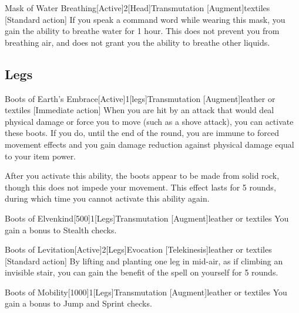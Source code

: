         \begin{magicitemdef}{Mask of Water Breathing}[Active]{2}[Head]{Transmutation [Augment]}{textiles}
            [Standard action] If you speak a command word while wearing this mask, you gain the ability to breathe water for 1 hour.
            This does not prevent you from breathing air, and does not grant you the ability to breathe other liquids.
        \end{magicitemdef}

    \subsection{Legs}

        \begin{magicitemdef}{Boots of Earth's Embrace}[Active]{1}[legs]{Transmutation [Augment]}{leather or textiles}
            [Immediate action] When you are hit by an attack that would deal physical damage or force you to move (such as a shove attack), you can activate these boots.
            If you do, until the end of the round, you are immune to forced movement effects and you gain damage reduction against physical damage equal to your item power.

            After you activate this ability, the boots appear to be made from solid rock, though this does not impede your movement.
            This effect lasts for 5 rounds, during which time you cannot activate this ability again.
        \end{magicitemdef}

        \begin{magicitemdef}{Boots of Elvenkind}[500]{1}[Legs]{Transmutation [Augment]}{leather or textiles}
             You gain a  bonus to Stealth checks.
        \end{magicitemdef}

        \begin{magicitemdef}{Boots of Levitation}[Active]{2}[Legs]{Evocation [Telekinesis]}{leather or textiles}
            [Standard action] By lifting and planting one leg in mid-air, as if climbing an invisible stair, you can gain the benefit of the  spell on yourself for 5 rounds.
        \end{magicitemdef}

        \begin{magicitemdef}{Boots of Mobility}[1000]{1}[Legs]{Transmutation [Augment]}{leather or textiles}
             You gain a  bonus to Jump and Sprint checks.
        \end{magicitemdef}

